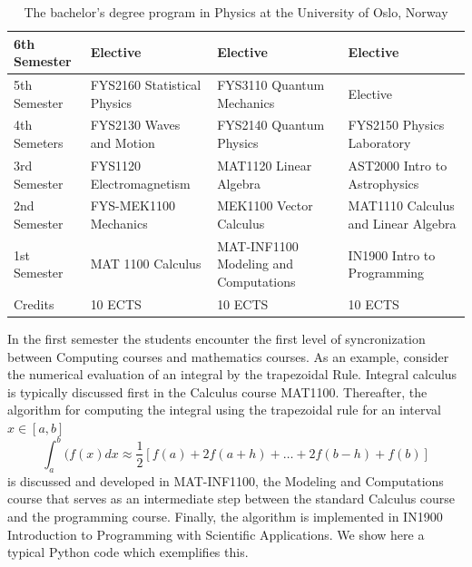 \documentclass[graybox,envcountchap,sectrefs]{svmult}
\begin{document}
\begin{table}
\caption{The bachelor's degree program in Physics at the University of Oslo, Norway}
\begin{footnotesize}
\begin{tabular}{|l|l|l|l|}
\hline
\multicolumn{1}{|l}{ 6th Semester } & \multicolumn{1}{|l|}{ Elective } & \multicolumn{1}{|l|}{ Elective } & \multicolumn{1}{|l|}{ Elective } \\
\hline
5th Semester & FYS2160 Statistical Physics & FYS3110 Quantum Mechanics             & Elective                                                        \\
\hline
4th Semeters & FYS2130 Waves and Motion    & FYS2140 Quantum Physics               & FYS2150 Physics Laboratory                                      \\
\hline
3rd Semester & FYS1120 Electromagnetism    & MAT1120 Linear Algebra                & AST2000 Intro to Astrophysics                            \\
\hline
2nd Semester & FYS-MEK1100 Mechanics       & MEK1100 Vector Calculus               & MAT1110 Calculus and Linear Algebra                             \\
\hline
1st Semester & MAT 1100 Calculus           & MAT-INF1100 Modeling and Computations & IN1900 Intro to Programming \\
\hline
Credits      & 10 ECTS                     & 10 ECTS                               & 10 ECTS                                                         \\
\hline
\end{tabular}
\end{footnotesize}
\end{table}


In the first semester the students encounter the first level of syncronization between Computing courses  and mathematics courses. 
As an example, consider the numerical evaluation of an integral by  the trapezoidal Rule. Integral calculus is typically discussed first in the Calculus course MAT1100.
Thereafter, the algorithm for computing the  integral using the trapezoidal rule for an interval $x \in [a,b]$
\[
  \int_a^b(f(x) dx \approx \frac{1}{2}\left [f(a)+2f(a+h)+\dots+2f(b-h)+f(b)\right] 
\]
is discussed and developed in MAT-INF1100, the Modeling and Computations course that serves as an intermediate step between the standard Calculus course and the programming course. Finally, the algorithm is implemented in   IN1900 Introduction to Programming with Scientific Applications.
We show here a typical Python code which exemplifies this.
\end{document}
